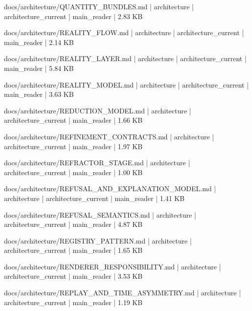 \documentclass[11pt,a4paper]{report}
\begin{document}
{\small\ttfamily\raggedright docs/\allowbreak{}architecture/\allowbreak{}QUANTITY\_BUNDLES.\allowbreak{}md | architecture | architecture\_current | main\_reader | 2.\allowbreak{}83 KB\par}
{\small\ttfamily\raggedright docs/\allowbreak{}architecture/\allowbreak{}REALITY\_FLOW.\allowbreak{}md | architecture | architecture\_current | main\_reader | 2.\allowbreak{}14 KB\par}
{\small\ttfamily\raggedright docs/\allowbreak{}architecture/\allowbreak{}REALITY\_LAYER.\allowbreak{}md | architecture | architecture\_current | main\_reader | 5.\allowbreak{}84 KB\par}
{\small\ttfamily\raggedright docs/\allowbreak{}architecture/\allowbreak{}REALITY\_MODEL.\allowbreak{}md | architecture | architecture\_current | main\_reader | 3.\allowbreak{}63 KB\par}
{\small\ttfamily\raggedright docs/\allowbreak{}architecture/\allowbreak{}REDUCTION\_MODEL.\allowbreak{}md | architecture | architecture\_current | main\_reader | 1.\allowbreak{}66 KB\par}
{\small\ttfamily\raggedright docs/\allowbreak{}architecture/\allowbreak{}REFINEMENT\_CONTRACTS.\allowbreak{}md | architecture | architecture\_current | main\_reader | 1.\allowbreak{}97 KB\par}
{\small\ttfamily\raggedright docs/\allowbreak{}architecture/\allowbreak{}REFRACTOR\_STAGE.\allowbreak{}md | architecture | architecture\_current | main\_reader | 1.\allowbreak{}00 KB\par}
{\small\ttfamily\raggedright docs/\allowbreak{}architecture/\allowbreak{}REFUSAL\_AND\_EXPLANATION\_MODEL.\allowbreak{}md | architecture | architecture\_current | main\_reader | 1.\allowbreak{}41 KB\par}
{\small\ttfamily\raggedright docs/\allowbreak{}architecture/\allowbreak{}REFUSAL\_SEMANTICS.\allowbreak{}md | architecture | architecture\_current | main\_reader | 4.\allowbreak{}87 KB\par}
{\small\ttfamily\raggedright docs/\allowbreak{}architecture/\allowbreak{}REGISTRY\_PATTERN.\allowbreak{}md | architecture | architecture\_current | main\_reader | 1.\allowbreak{}65 KB\par}
{\small\ttfamily\raggedright docs/\allowbreak{}architecture/\allowbreak{}RENDERER\_RESPONSIBILITY.\allowbreak{}md | architecture | architecture\_current | main\_reader | 3.\allowbreak{}53 KB\par}
{\small\ttfamily\raggedright docs/\allowbreak{}architecture/\allowbreak{}REPLAY\_AND\_TIME\_ASYMMETRY.\allowbreak{}md | architecture | architecture\_current | main\_reader | 1.\allowbreak{}19 KB\par}
\end{document}
